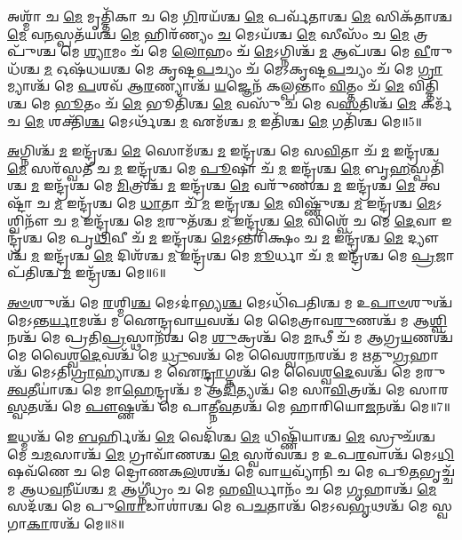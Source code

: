 𑌅𑌶𑍍𑌮𑌾᳴ 𑌚 \ul{𑌮𑍇} 𑌮𑍃𑌤𑍍𑌤𑌿᳴𑌕𑌾 𑌚 𑌮𑍇 \ul{𑌗𑌿}\-𑌰𑌯᳴𑌶𑍍𑌚 \ul{𑌮𑍇} 𑌪𑌰𑍍𑌵᳴𑌤𑌾𑌶𑍍𑌚 \ul{𑌮𑍇} 𑌸𑌿𑌕᳴𑌤𑌾𑌶𑍍𑌚 \ul{𑌮𑍇} 𑌵\-\ul{𑌨}\-𑌸𑍍𑌪𑌤᳴𑌯𑌶𑍍𑌚 \ul{𑌮𑍇} 𑌹𑌿𑌰᳴𑌣𑍍𑌯𑌂 \ul{𑌚} 𑌮𑍇𑌽𑌯᳴𑌶𑍍𑌚 \ul{𑌮𑍇} 𑌸𑍀𑌸𑌂᳴ 𑌚 \ul{𑌮𑍇} 𑌤𑍍𑌰𑌪𑍁᳴𑌶𑍍𑌚 𑌮𑍇 \ul{𑌶𑍍𑌯𑌾}\-𑌮𑌂 𑌚᳴ 𑌮𑍇 \ul{𑌲𑍋}\-𑌹𑌂 𑌚᳴ \ul{𑌮𑍇}\-𑌽𑌗𑍍𑌨𑌿𑌶𑍍𑌚᳴ \ul{𑌮} 𑌆𑌪᳴𑌶𑍍𑌚 𑌮𑍇 \ul{𑌵𑍀}\-𑌰𑍁𑌧᳴𑌶𑍍𑌚 \ul{𑌮} 𑌓𑌷᳴𑌧𑌯𑌶𑍍𑌚 𑌮𑍇 𑌕𑍃𑌷𑍍𑌟\-\ul{𑌪}\-𑌚𑍍𑌯𑌂 𑌚᳴ 𑌮𑍇𑌽𑌕𑍃𑌷𑍍𑌟\-\ul{𑌪}\-𑌚𑍍𑌯𑌂 𑌚᳴ 𑌮𑍇 \ul{𑌗𑍍𑌰𑌾}\-𑌮𑍍𑌯𑌾𑌶𑍍𑌚᳴ 𑌮𑍇 \ul{𑌪}\-𑌶𑌵᳴ 𑌆\-\ul{𑌰}\-𑌣𑍍𑌯𑌾𑌶𑍍𑌚᳴ \ul{𑌯}\-𑌜𑍍𑌞𑍇𑌨᳴ 𑌕𑌲𑍍𑌪𑌨𑍍𑌤𑌾𑌂 \ul{𑌵𑌿}\-𑌤𑍍𑌤𑌂 𑌚᳴ \ul{𑌮𑍇} 𑌵𑌿𑌤𑍍𑌤𑌿᳴𑌶𑍍𑌚 𑌮𑍇 \ul{𑌭𑍂}\-𑌤𑌂 𑌚᳴ \ul{𑌮𑍇} 𑌭𑍂𑌤𑌿᳴𑌶𑍍𑌚 \ul{𑌮𑍇} 𑌵𑌸𑍁᳴ 𑌚 𑌮𑍇 𑌵\-\ul{𑌸}\-𑌤𑌿𑌶𑍍𑌚᳴ \ul{𑌮𑍇} 𑌕𑌰𑍍𑌮᳴ 𑌚 \ul{𑌮𑍇} 𑌶𑌕𑍍𑌤𑌿᳴\-\ul{𑌶𑍍𑌚} 𑌮𑍇𑌽𑌰𑍍𑌥᳴𑌶𑍍𑌚 \ul{𑌮} 𑌏𑌮᳴𑌶𑍍𑌚 \ul{𑌮} 𑌇𑌤𑌿᳴𑌶𑍍𑌚 \ul{𑌮𑍇} 𑌗𑌤𑌿᳴𑌶𑍍𑌚 𑌮𑍇॥5॥ 

\-\ul{𑌅}\-𑌗𑍍𑌨𑌿𑌶𑍍𑌚᳴ \ul{𑌮} 𑌇𑌨𑍍𑌦𑍍𑌰᳴𑌶𑍍𑌚 \ul{𑌮𑍇} 𑌸𑍋𑌮᳴𑌶𑍍𑌚 \ul{𑌮} 𑌇𑌨𑍍𑌦𑍍𑌰᳴𑌶𑍍𑌚 𑌮𑍇 𑌸\-\ul{𑌵𑌿}\-𑌤𑌾 𑌚᳴ \ul{𑌮} 𑌇𑌨𑍍𑌦𑍍𑌰᳴𑌶𑍍𑌚 \ul{𑌮𑍇} 𑌸𑌰᳴𑌸𑍍𑌵𑌤𑍀 𑌚 \ul{𑌮} 𑌇𑌨𑍍𑌦𑍍𑌰᳴𑌶𑍍𑌚 𑌮𑍇 \ul{𑌪𑍂}\-𑌷𑌾 𑌚᳴ \ul{𑌮} 𑌇𑌨𑍍𑌦𑍍𑌰᳴𑌶𑍍𑌚 \ul{𑌮𑍇} 𑌬𑍃\-\ul{𑌹}\-𑌸𑍍𑌪𑌤𑌿᳴𑌶𑍍𑌚 \ul{𑌮} 𑌇𑌨𑍍𑌦𑍍𑌰᳴𑌶𑍍𑌚 𑌮𑍇 \ul{𑌮𑌿}\-𑌤𑍍𑌰𑌶𑍍𑌚᳴ \ul{𑌮} 𑌇𑌨𑍍𑌦𑍍𑌰᳴𑌶𑍍𑌚 \ul{𑌮𑍇} 𑌵𑌰𑍁᳴𑌣𑌶𑍍𑌚 \ul{𑌮} 𑌇𑌨𑍍𑌦𑍍𑌰᳴𑌶𑍍𑌚 \ul{𑌮𑍇} 𑌤𑍍𑌵𑌷𑍍𑌟𑌾᳴ 𑌚 \ul{𑌮} 𑌇𑌨𑍍𑌦𑍍𑌰᳴𑌶𑍍𑌚 𑌮𑍇 \ul{𑌧𑌾}\-𑌤𑌾 𑌚᳴ \ul{𑌮} 𑌇𑌨𑍍𑌦𑍍𑌰᳴𑌶𑍍𑌚 \ul{𑌮𑍇} 𑌵𑌿𑌷𑍍𑌣𑍁᳴𑌶𑍍𑌚 \ul{𑌮} 𑌇𑌨𑍍𑌦𑍍𑌰᳴𑌶𑍍𑌚 \ul{𑌮𑍇}\-𑌽𑌶𑍍𑌵𑌿𑌨𑍗᳴ 𑌚 \ul{𑌮} 𑌇𑌨𑍍𑌦𑍍𑌰᳴𑌶𑍍𑌚 𑌮𑍇 \ul{𑌮}\-𑌰𑍁𑌤᳴𑌶𑍍𑌚 \ul{𑌮} 𑌇𑌨𑍍𑌦𑍍𑌰᳴𑌶𑍍𑌚 \ul{𑌮𑍇} 𑌵𑌿𑌶𑍍𑌵𑍇᳴ 𑌚 𑌮𑍇 \ul{𑌦𑍇}\-𑌵𑌾 𑌇𑌨𑍍𑌦𑍍𑌰᳴𑌶𑍍𑌚 𑌮𑍇 𑌪𑍃\-\ul{𑌥𑌿}\-𑌵𑍀 𑌚᳴ \ul{𑌮} 𑌇𑌨𑍍𑌦𑍍𑌰᳴𑌶𑍍𑌚 \ul{𑌮𑍇}\-𑌽𑌨𑍍𑌤𑌰𑌿᳴𑌕𑍍𑌷𑌂 𑌚 \ul{𑌮} 𑌇𑌨𑍍𑌦𑍍𑌰᳴𑌶𑍍𑌚 \ul{𑌮𑍇} 𑌦𑍍𑌯𑍗𑌶𑍍𑌚᳴ \ul{𑌮} 𑌇𑌨𑍍𑌦𑍍𑌰᳴𑌶𑍍𑌚 \ul{𑌮𑍇} 𑌦𑌿𑌶᳴𑌶𑍍𑌚 \ul{𑌮} 𑌇𑌨𑍍𑌦𑍍𑌰᳴𑌶𑍍𑌚 𑌮𑍇 \ul{𑌮𑍂}\-𑌰𑍍𑌧𑌾 𑌚᳴ \ul{𑌮} 𑌇𑌨𑍍𑌦𑍍𑌰᳴𑌶𑍍𑌚 𑌮𑍇 \ul{𑌪𑍍𑌰}\-𑌜𑌾𑌪᳴𑌤𑌿𑌶𑍍𑌚 \ul{𑌮} 𑌇𑌨𑍍𑌦𑍍𑌰᳴𑌶𑍍𑌚 𑌮𑍇॥6॥ 

\-\ul{𑌅}\-\-\ul{𑍞}\-𑌶𑍁𑌶𑍍𑌚᳴ 𑌮𑍇 \ul{𑌰}\-𑌶𑍍𑌮𑌿\-\ul{𑌶𑍍𑌚} 𑌮𑍇𑌽𑌦𑌾॑𑌭𑍍𑌯\-\ul{𑌶𑍍𑌚} 𑌮𑍇𑌽𑌧𑌿᳴𑌪𑌤𑌿𑌶𑍍𑌚 𑌮 𑌉\-\ul{𑌪𑌾}\-\-\ul{𑍞}\-𑌶𑍁𑌶𑍍𑌚᳴ 𑌮𑍇𑌽𑌨𑍍𑌤\-\ul{𑌰𑍍𑌯𑌾}\-𑌮𑌶𑍍𑌚᳴ 𑌮 𑌐𑌨𑍍𑌦𑍍𑌰𑌵𑌾\-\ul{𑌯}\-𑌵𑌶𑍍𑌚᳴ 𑌮𑍇 𑌮𑍈𑌤𑍍𑌰𑌾𑌵\-\ul{𑌰𑍁}\-𑌣𑌶𑍍𑌚᳴ 𑌮 𑌆\-\ul{𑌶𑍍𑌵𑌿}\-𑌨𑌶𑍍𑌚᳴ 𑌮𑍇 𑌪𑍍𑌰𑌤𑌿\-\ul{𑌪𑍍𑌰}\-𑌸𑍍𑌥𑌾𑌨᳴𑌶𑍍𑌚 𑌮𑍇 \ul{𑌶𑍁}\-𑌕𑍍𑌰𑌶𑍍𑌚᳴ 𑌮𑍇 \ul{𑌮}\-𑌨𑍍𑌥𑍀 𑌚᳴ 𑌮 𑌆𑌗𑍍𑌰\-\ul{𑌯}\-𑌣𑌶𑍍𑌚᳴ 𑌮𑍇 𑌵𑍈𑌶𑍍𑌵\-\ul{𑌦𑍇}\-𑌵𑌶𑍍𑌚᳴ 𑌮𑍇 \ul{𑌧𑍍𑌰𑍁}\-𑌵𑌶𑍍𑌚᳴ 𑌮𑍇 𑌵𑍈𑌶𑍍𑌵𑌾\-\ul{𑌨}\-𑌰𑌶𑍍𑌚᳴ 𑌮 𑌋𑌤𑍁\-\ul{𑌗𑍍𑌰}\-𑌹𑌾𑌶𑍍𑌚᳴ 𑌮𑍇𑌽𑌤𑌿\-\ul{𑌗𑍍𑌰𑌾}\-𑌹𑍍𑌯𑌾॑𑌶𑍍𑌚 𑌮 𑌐\-\ul{𑌨𑍍𑌦𑍍𑌰𑌾}\-𑌗𑍍𑌨𑌶𑍍𑌚᳴ 𑌮𑍇 𑌵𑍈𑌶𑍍𑌵\-\ul{𑌦𑍇}\-𑌵𑌶𑍍𑌚᳴ 𑌮𑍇 𑌮𑌰𑍁\-\ul{𑌤𑍍𑌵}\-𑌤𑍀𑌯𑌾॑𑌶𑍍𑌚 𑌮𑍇 𑌮𑌾\-\ul{𑌹𑍇}\-𑌨𑍍𑌦𑍍𑌰𑌶𑍍𑌚᳴ 𑌮 𑌆\-\ul{𑌦𑌿}\-𑌤𑍍𑌯𑌶𑍍𑌚᳴ 𑌮𑍇 𑌸𑌾\-\ul{𑌵𑌿}\-𑌤𑍍𑌰𑌶𑍍𑌚᳴ 𑌮𑍇 𑌸𑌾𑌰\-\ul{𑌸𑍍𑌵}\-𑌤𑌶𑍍𑌚᳴ 𑌮𑍇 \ul{𑌪𑍗}\-𑌷𑍍𑌣𑌶𑍍𑌚᳴ 𑌮𑍇 𑌪𑌾𑌤𑍍𑌨𑍀\-\ul{𑌵}\-𑌤𑌶𑍍𑌚᳴ 𑌮𑍇 𑌹𑌾𑌰𑌿𑌯𑍋\-\ul{𑌜}\-𑌨𑌶𑍍𑌚᳴ 𑌮𑍇॥7॥ 

\-\ul{𑌇}\-𑌧𑍍𑌮𑌶𑍍𑌚᳴ 𑌮𑍇 \ul{𑌬}\-𑌰𑍍𑌹𑌿𑌶𑍍𑌚᳴ \ul{𑌮𑍇} 𑌵𑍇𑌦𑌿᳴𑌶𑍍𑌚 \ul{𑌮𑍇} 𑌧𑌿𑌷𑍍𑌣𑌿᳴𑌯𑌾𑌶𑍍𑌚 \ul{𑌮𑍇} 𑌸𑍍𑌰𑍁𑌚᳴𑌶𑍍𑌚 𑌮𑍇 𑌚\-\ul{𑌮}\-𑌸𑌾𑌶𑍍𑌚᳴ \ul{𑌮𑍇} 𑌗𑍍𑌰𑌾𑌵𑌾᳴𑌣𑌶𑍍𑌚 \ul{𑌮𑍇} 𑌸𑍍𑌵𑌰᳴𑌵𑌶𑍍𑌚 𑌮 𑌉𑌪\-\ul{𑌰}\-𑌵𑌾𑌶𑍍𑌚᳴ 𑌮𑍇𑌽\-\ul{𑌧𑌿}\-𑌷𑌵᳴𑌣𑍇 𑌚 𑌮𑍇 𑌦𑍍𑌰𑍋𑌣𑌕\-\ul{𑌲}\-𑌶𑌶𑍍𑌚᳴ 𑌮𑍇 𑌵𑌾\-\ul{𑌯}\-𑌵𑍍𑌯𑌾᳴𑌨𑌿 𑌚 𑌮𑍇 𑌪𑍂\-\ul{𑌤}\-𑌭𑍃𑌚𑍍𑌚᳴ 𑌮 𑌆𑌧\-\ul{𑌵}\-𑌨𑍀𑌯᳴𑌶𑍍𑌚 \ul{𑌮} 𑌆𑌗𑍍𑌨𑍀॑𑌧𑍍𑌰𑌂 𑌚 𑌮𑍇 𑌹\-\ul{𑌵𑌿}\-𑌰𑍍𑌧𑌾𑌨𑌂᳴ 𑌚 𑌮𑍇 \ul{𑌗𑍃}\-𑌹𑌾𑌶𑍍𑌚᳴ \ul{𑌮𑍇} 𑌸𑌦᳴𑌶𑍍𑌚 𑌮𑍇 𑌪𑍁\-\ul{𑌰𑍋}\-𑌡𑌾𑌶𑌾॑𑌶𑍍𑌚 𑌮𑍇 𑌪\-\ul{𑌚}\-𑌤𑌾𑌶𑍍𑌚᳴ 𑌮𑍇𑌽𑌵\-\ul{𑌭𑍃}\-𑌥𑌶𑍍𑌚᳴ 𑌮𑍇 𑌸𑍍𑌵𑌗𑌾\-\ul{𑌕𑌾}\-𑌰𑌶𑍍𑌚᳴ 𑌮𑍇॥8॥ 

